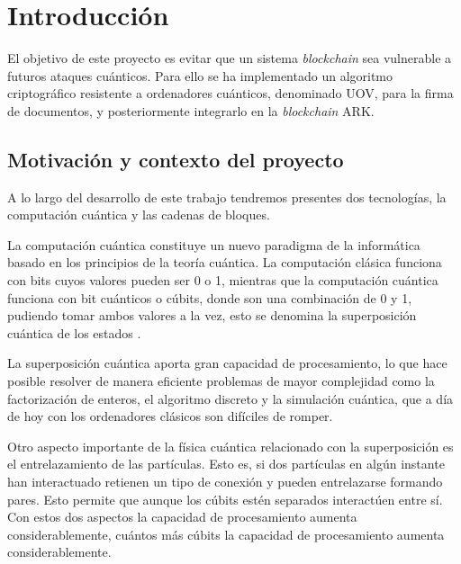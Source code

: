 \chapter{Introducción}

El objetivo de este proyecto es evitar que un sistema \textit{blockchain} sea vulnerable a futuros ataques cuánticos. Para ello se ha implementado un algoritmo criptográfico resistente a ordenadores cuánticos, denominado UOV, para la firma de documentos, y posteriormente integrarlo en la \textit{blockchain} ARK.

\section{Motivación y contexto del proyecto}
\label{sec:intro:motivacion} %


A lo largo del desarrollo de este trabajo tendremos presentes dos tecnologías, la computación cuántica y las cadenas de bloques. 

La computación cuántica constituye un nuevo paradigma de la informática basado en los principios de la teoría cuántica. La computación clásica funciona con bits cuyos valores pueden ser 0 o 1, mientras que la computación cuántica funciona con bit cuánticos o cúbits, donde son una combinación de 0 y 1, pudiendo tomar ambos valores a la vez, esto se denomina la superposición cuántica de los estados \cite{computacioncuantica-criptografia}.

La superposición cuántica aporta gran capacidad de procesamiento, lo que hace posible resolver de manera eficiente problemas de mayor complejidad como la factorización de enteros, el algoritmo discreto y la simulación cuántica, que a día de hoy con los ordenadores clásicos son difíciles de romper. 

Otro aspecto importante de la física cuántica relacionado con la superposición es el entrelazamiento de las partículas\cite{cumputacioncuanticaclasica}. Esto es, si dos partículas en algún instante han interactuado retienen un tipo de conexión y pueden entrelazarse formando pares. Esto permite que aunque los cúbits estén separados interactúen entre sí. Con estos dos aspectos la capacidad de procesamiento aumenta considerablemente, cuántos más cúbits la capacidad de procesamiento aumenta considerablemente.

